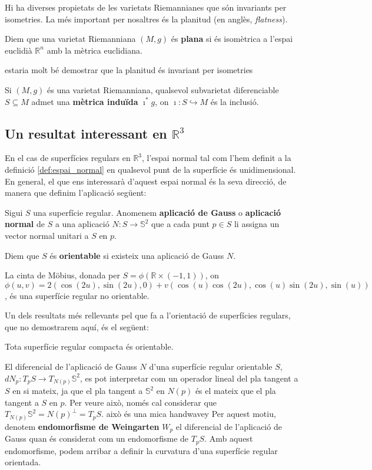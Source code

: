 Hi ha diverses propietats de les varietats Riemannianes que són invariants per isometries. La més important per nosaltres és la planitud (en anglès, \textit{flatness}).
\begin{defi}\label{def:flatness}
    Diem que una varietat Riemanniana $(M,g)$ és \textbf{plana} si és isomètrica a l'espai euclidià $\mathbb R^n$ amb la mètrica euclidiana.
\end{defi}

{\color{blue} estaria molt bé demostrar que la planitud és invariant per isometries}

Si $(M,g)$ és una varietat Riemanniana, qualsevol subvarietat diferenciable $S\subseteq M$ admet una \textbf{mètrica induïda} $\imath^*g$, on $\imath:S\hookrightarrow M$ és la inclusió.


\subsection{Un resultat interessant en $\mathbb R^3$}

En el cas de superfícies regulars en $\mathbb R^3$, l'espai normal tal com l'hem definit a la definició \ref{def:espai_normal} en qualsevol punt de la superfície és unidimensional. En general, el que ens interessarà d'aquest espai normal és la seva direcció, de manera que definim l'aplicació següent:
\begin{defi}
    Sigui $S$ una superfície regular. Anomenem \textbf{aplicació de Gauss} o \textbf{aplicació normal} de $S$ a una aplicació $N:S\to \mathbb S^2$ que a cada punt $p\in S$ li assigna un vector normal unitari a $S$ en $p$.
\end{defi}
Diem que $S$ és \textbf{orientable} si existeix una aplicació de Gauss $N$.
\begin{ex}
    La cinta de Möbius, donada per $S=\phi(\mathbb R \times (-1,1))$, on $\phi(u,v) = 2(\cos(2u), \sin(2u), 0) + v(\cos(u)\cos(2u), \cos(u)\sin(2u), \sin(u))$, és una superfície regular no orientable.
\end{ex}
Un dels resultats més rellevants pel que fa a l'orientació de superfícies regulars, que no demostrarem aquí, és el següent:
\begin{teo}
    Tota superfície regular compacta és orientable.
\end{teo}

El diferencial de l'aplicació de Gauss $N$ d'una superfície regular orientable $S$, $dN_p:T_pS\to T_{N(p)}\mathbb S^2$, es pot interpretar com un operador lineal del pla tangent a $S$ en si mateix, ja que el pla tangent a $\mathbb S^2$ en $N(p)$ és el mateix que el pla tangent a $S$ en $p$. Per veure això, només cal considerar que $T_{N(p)}\mathbb S^2 = N(p)^\perp = T_pS$.{\color{blue} això és una mica handwavey} Per aquest motiu, denotem \textbf{endomorfisme de Weingarten} $W_p$ el diferencial de l'aplicació de Gauss quan és considerat com un endomorfisme de $T_pS$. Amb aquest endomorfisme, podem arribar a definir la curvatura d'una superfície regular orientada.

